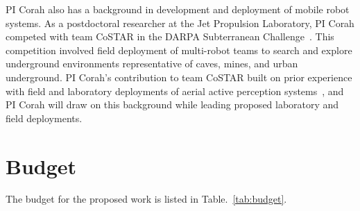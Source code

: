\documentclass[11pt]{article}
\begin{document}
PI Corah also has a background in development and deployment of mobile robot
systems.
As a postdoctoral researcher at the Jet Propulsion Laboratory, PI Corah competed
with team CoSTAR in the DARPA Subterranean
Challenge~\citep{morrell2024addendum}.
This competition involved field deployment of multi-robot teams to search and
explore underground environments representative of caves, mines, and urban
underground.
PI Corah's contribution to team CoSTAR built on prior experience
with field and laboratory deployments of aerial active perception
systems~\citep{corah2019auro,goel2019fsr}, and
PI Corah will draw on this background while leading proposed laboratory and
field deployments.


\setlength{\bibsep}{2pt plus 0.3ex}
{
  \linespread{0.0}
  \footnotesize
  
}

\newpage
\section{Budget}

The budget for the proposed work is listed in Table.~\ref{tab:budget}.


\end{document}
